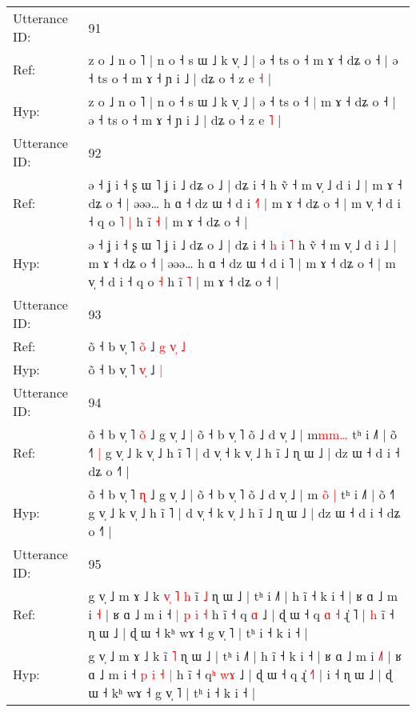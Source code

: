 \documentclass[10pt]{article}
\DeclareRobustCommand{\hl}[1]{{\textcolor{red}{#1}}}
\begin{document}
\begin{longtable}{ll}
 \\
\midrule
Utterance ID: & 91 \\
Ref: & z o ˩ n o ˥ | n o ˧ s ɯ ˩ k v̩ ˩ | ə ˧ ts o ˧\hl{}\hl{} m ɤ ˧ dʑ o ˧ | ə ˧ ts o ˧ m ɤ ˧ ɲ i ˩ | dʑ o ˧ z e \hl{˧} |
 \\
Hyp: & z o ˩ n o ˥ | n o ˧ s ɯ ˩ k v̩ ˩ | ə ˧ ts o ˧\hl{ }\hl{|} m ɤ ˧ dʑ o ˧ | ə ˧ ts o ˧ m ɤ ˧ ɲ i ˩ | dʑ o ˧ z e \hl{˥} |
 \\
\midrule
Utterance ID: & 92 \\
Ref: & ə ˧ ʝ i ˧ ʂ ɯ ˥ ʝ i ˩ dʑ o ˩ | dʑ i ˧\hl{}\hl{}\hl{}\hl{}\hl{}\hl{} h ṽ ˧ m v̩ ˩ d i ˩ | m ɤ ˧ dʑ o ˧ | əəə… h ɑ ˧ dz ɯ ˧ d i \hl{˧}˥ | m ɤ ˧ dʑ o ˧ | m v̩ ˧ d i ˧ q o\hl{ }\hl{˥} \hl{|} h ĩ \hl{˧} | m ɤ ˧ dʑ o ˧ |
 \\
Hyp: & ə ˧ ʝ i ˧ ʂ ɯ ˥ ʝ i ˩ dʑ o ˩ | dʑ i ˧\hl{ }\hl{h}\hl{ }\hl{i}\hl{ }\hl{˥} h ṽ ˧ m v̩ ˩ d i ˩ | m ɤ ˧ dʑ o ˧ | əəə… h ɑ ˧ dz ɯ ˧ d i \hl{}˥ | m ɤ ˧ dʑ o ˧ | m v̩ ˧ d i ˧ q o\hl{}\hl{} \hl{˧} h ĩ \hl{˥} | m ɤ ˧ dʑ o ˧ |
 \\
\midrule
Utterance ID: & 93 \\
Ref: & õ ˧ b v̩ ˥ \hl{o}\hl{̃} ˩\hl{ }\hl{g}\hl{ }\hl{v}\hl{̩} \hl{˩}
 \\
Hyp: & õ ˧ b v̩ ˥ \hl{v}\hl{̩} ˩\hl{}\hl{}\hl{}\hl{}\hl{} \hl{|}
 \\
\midrule
Utterance ID: & 94 \\
Ref: & õ ˧ b v̩ ˥ \hl{o}\hl{̃} ˩ g v̩ ˩ | õ ˧ b v̩ ˥ õ ˩ d v̩ ˩ | m\hl{}\hl{}\hl{m}\hl{m}\hl{…} tʰ i ˩˥ | õ ˧˥\hl{ }\hl{|} g v̩ ˩ k v̩ ˩ h ĩ ˥ | d v̩ ˧ k v̩ ˩ h ĩ ˩ ɳ ɯ ˩ | dz ɯ ˧ d i ˧ dʑ o ˧˥ |
 \\
Hyp: & õ ˧ b v̩ ˥ \hl{}\hl{ɳ} ˩ g v̩ ˩ | õ ˧ b v̩ ˥ õ ˩ d v̩ ˩ | m\hl{ }\hl{o}\hl{̃}\hl{ }\hl{|} tʰ i ˩˥ | õ ˧˥\hl{}\hl{} g v̩ ˩ k v̩ ˩ h ĩ ˥ | d v̩ ˧ k v̩ ˩ h ĩ ˩ ɳ ɯ ˩ | dz ɯ ˧ d i ˧ dʑ o ˧˥ |
 \\
\midrule
Utterance ID: & 95 \\
Ref: & g v̩ ˩ m ɤ ˩ k\hl{ }\hl{v}\hl{̩}\hl{ }\hl{˥}\hl{ }\hl{h} ĩ \hl{˩} ɳ ɯ ˩ | tʰ i ˩˥ | h ĩ ˧ k i ˧ | ʁ ɑ ˩ m i \hl{}\hl{˧} | ʁ ɑ ˩ m i ˧ \hl{|} \hl{p} \hl{i} \hl{˧} h ĩ ˧ q\hl{} \hl{}\hl{ɑ} ˩ | ɖ ɯ ˧ q\hl{ }\hl{ɑ}\hl{ }\hl{˧} ɻ̍ \hl{}˥ |\hl{ }\hl{h} i\hl{̃} ˧ ɳ ɯ ˩ | ɖ ɯ ˧ kʰ wɤ ˧ g v̩ ˥ | tʰ i ˧ k i ˧ |
 \\
Hyp: & g v̩ ˩ m ɤ ˩ k\hl{}\hl{}\hl{}\hl{}\hl{}\hl{}\hl{} ĩ \hl{˥} ɳ ɯ ˩ | tʰ i ˩˥ | h ĩ ˧ k i ˧ | ʁ ɑ ˩ m i \hl{˩}\hl{˥} | ʁ ɑ ˩ m i ˧ \hl{p} \hl{i} \hl{˧} \hl{|} h ĩ ˧ q\hl{ʰ} \hl{w}\hl{ɤ} ˩ | ɖ ɯ ˧ q\hl{}\hl{}\hl{}\hl{} ɻ̍ \hl{˧}˥ |\hl{}\hl{} i\hl{} ˧ ɳ ɯ ˩ | ɖ ɯ ˧ kʰ wɤ ˧ g v̩ ˥ | tʰ i ˧ k i ˧ |

\end{longtable}
\end{document}
